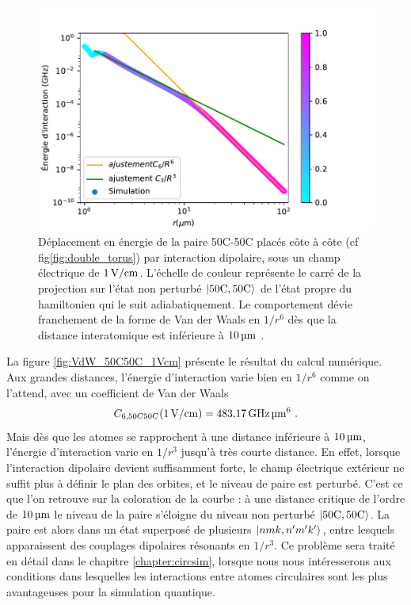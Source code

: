 \begin{figure}[!h]
\centering
\includegraphics[width=1\linewidth]{figures/theory/VdW_50C50C_1Vcm}
\caption[Interaction dipolaire 50C-50C]{Déplacement en énergie de la paire 50C-50C placés côte à côte (cf fig\eqref{fig:double_torus}) par interaction dipolaire, sous un champ électrique de $\SIvv{1}{\V / \cm}$. L'échelle de couleur représente le carré de la projection sur l'état non perturbé $\ket{50\text{C},50\text{C}}$ de l'état propre du hamiltonien qui le suit adiabatiquement.
Le comportement dévie franchement de la forme de Van der Waals en $1/r^6$ dès que la distance interatomique est inférieure à $\SIv{10}{\micro\meter}$.
}
\label{fig:VdW_50C50C_1Vcm}
\end{figure}

La figure \eqref{fig:VdW_50C50C_1Vcm} présente le résultat du calcul numérique.
Aux grandes distances, l'énergie d'interaction varie bien en $1/r^6$ comme on l'attend, avec un coefficient de Van der Waals 
\begin{equation}
\label{eq:C6_50C50C}
C_{6,50C50C}(\SIvv{1}{V/cm}) = \SIv{483.17}{\GHz\raiseto{6}\um}.
\end{equation}
Mais dès que les atomes se rapprochent à une distance inférieure à $\SIvv{10}{\um}$, l'énergie d'interaction varie en $1/r^3$ jusqu'à très courte distance.
En effet, lorsque l'interaction dipolaire devient suffisamment forte, le champ électrique extérieur ne suffit plus à définir le plan des orbites, et le niveau de paire est perturbé.
C'est ce que l'on retrouve sur la coloration de la courbe : à une distance critique de l'ordre de $\SIvv{10}{\um}$ le niveau de la paire s'éloigne du niveau non perturbé $\ket{\mathrm{50C,50C}}$.
La paire est alors dans un état superposé de plusieurs $\ket{nmk,n'm'k'}$, entre lesquels apparaissent des couplages dipolaires résonants en $1/r^3$.
Ce problème sera traité en détail dans le chapitre \ref{chapter:circsim}, lorsque nous nous intéresserons aux conditions dans lesquelles les interactions entre atomes circulaires sont les plus avantageuses pour la simulation quantique.

